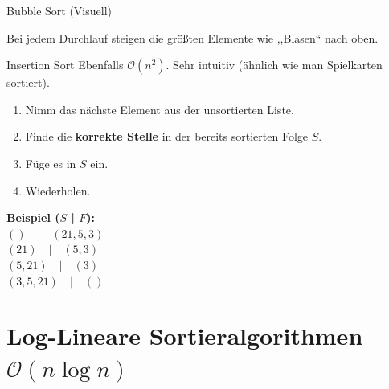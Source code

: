 \documentclass[aspectratio=169,11pt]{beamer}
\begin{document}
\begin{frame}{Bubble Sort (Visuell)}
    \begin{center}
    
    \vspace{0.5cm}
    \large Bei jedem Durchlauf steigen die größten Elemente wie ,,Blasen`` nach oben.
    \end{center}
\end{frame}


\begin{frame}{Insertion Sort}
    Ebenfalls $\mathcal{O}(n^2)$. Sehr intuitiv (ähnlich wie man Spielkarten sortiert).
    
    \begin{tcolorbox}[modernbox, title=Ablauf]
        \begin{enumerate}
            \item Nimm das nächste Element aus der unsortierten Liste.
            \item Finde die \textbf{korrekte Stelle} in der bereits sortierten Folge $S$.
            \item Füge es in $S$ ein.
            \item Wiederholen.
        \end{enumerate}
    \end{tcolorbox}
    
    \textbf{Beispiel ($S$ | $F$):} \\
    $() \quad | \quad (21, 5, 3)$ \\
    $(21) \quad | \quad (5, 3)$ \\
    $(5, 21) \quad | \quad (3)$ \\
    $(3, 5, 21) \quad | \quad ()$
\end{frame}

\section{Log-Lineare Sortieralgorithmen \texorpdfstring{$\mathcal{O}(n \log n)$}{O(n log n)}}
\end{document}
